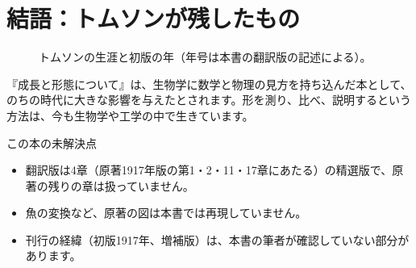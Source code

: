 \documentclass[a4paper,11pt,openany]{ltjsbook}
\begin{document}
\chapter*{結語：トムソンが残したもの}

\begin{figure}[htbp]
\centering
{}
\caption{トムソンの生涯と初版の年（年号は本書の翻訳版の記述による）。}
\end{figure}

『成長と形態について』は、生物学に数学と物理の見方を持ち込んだ本として、のちの時代に大きな影響を与えたとされます。形を測り、比べ、説明するという方法は、今も生物学や工学の中で生きています。

\begin{notebox}{この本の未解決点}
\begin{itemize}[leftmargin=1.5em]
\item 翻訳版は4章（原著1917年版の第1・2・11・17章にあたる）の精選版で、原著の残りの章は扱っていません。
\item 魚の変換など、原著の図は本書では再現していません。
\item 刊行の経緯（初版1917年、増補版）は、本書の筆者が確認していない部分があります。
\end{itemize}
\end{notebox}
\end{document}
